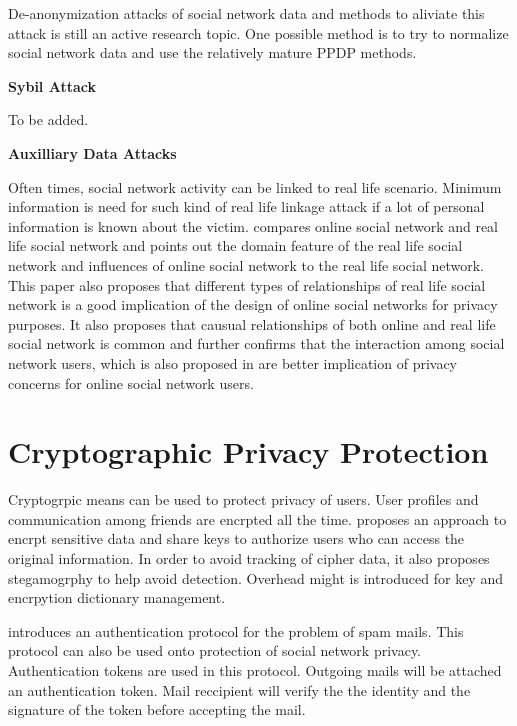 \documentclass[12pt]{article}
\begin{document}
De-anonymization attacks of social network data and methods to
aliviate this attack is still an active research topic. One possible
method is to try to normalize social network data and use the
relatively mature PPDP methods. 

\textbf{Sybil Attack} 

To be added. 

\textbf{Auxilliary Data Attacks}

Often times, social network activity can be linked to real life
scenario. Minimum information is need for such kind of real life
linkage attack if a lot of personal information is known about the
victim. \cite{real-life-social-network} compares online social network
and real life social network and points out the domain feature of the
real life social network and influences of online social network to
the real life social network. This paper also proposes that different
types of relationships of real life social network is a good
implication of the design of online social networks for privacy
purposes. It also proposes that causual relationships of both online
and real life social network is common and further confirms that the
interaction among social network users, which is also proposed in
\cite{user-interaction-social-link} are better implication of privacy
concerns for online social network users. 

\section{Cryptographic Privacy Protection \label{sec:crypto}}
Cryptogrpic means can be used to protect privacy of users. User
profiles and communication among friends are encrpted all the
time. \cite{noyb} proposes an approach to encrpt sensitive data and
share keys to authorize users who can access the original
information. In order to avoid tracking of cipher data, it also
proposes stegamogrphy to help avoid detection. Overhead might is
introduced for key and encrpytion dictionary management. 

\cite{reliable_email} introduces an authentication protocol for the
problem of spam mails. This protocol can also be used onto protection
of social network privacy. Authentication tokens are used in this
protocol. Outgoing mails will be attached an authentication
token. Mail reccipient will verify the the identity and the signature
of the token before accepting the mail.
\end{document}

